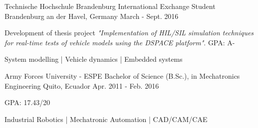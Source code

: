 
\begin{cventries}
  \cventry
    {Technische Hochschule Brandenburg}
    {International Exchange Student}
    {Brandenburg an der Havel, Germany}
    {March - Sept. 2016}
    {
      \begin{cvitems}
        \item {Development of thesis project \textit{"Implementation of HIL/SIL simulation techniques for real-time tests of vehicle models using the DSPACE platform"}. GPA: A-}
        \item {System modelling  |  Vehicle dynamics  |  Embedded systems}
      \end{cvitems}
    }

  \cventry
    {Army Forces University - ESPE}
    {Bachelor of Science (B.Sc.), in Mechatronics Engineering}
    {Quito, Ecuador}
    {Apr. 2011 - Feb. 2016}
    {
      \begin{cvitems}
        \item {GPA: 17.43/20}
        \item {Industrial Robotics  |  Mechatronic Automation  |  CAD/CAM/CAE}
      \end{cvitems}
    }
\end{cventries}
